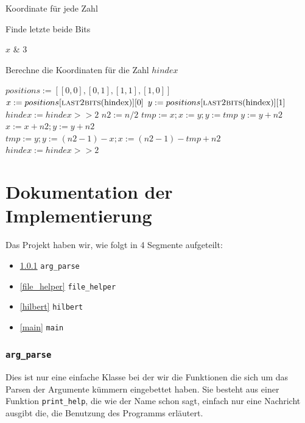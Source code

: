 \documentclass[course=erap]{aspdoc}
\begin{document}
\begin{algorithm}[H]
\caption{Koordinate für jede Zahl}
\begin{algorithmic}[1]
    \State {}
\EndFor
\end{algorithmic}
\end{algorithm}
\begin{algorithm}[H]
\caption{Finde letzte beide Bits}
\begin{algorithmic}[1]
	\State \Return $x$ \& $3$
\EndFunction
\end{algorithmic}
\end{algorithm}
\begin{algorithm}[H]
\caption{Berechne die Koordinaten für die Zahl $hindex$}
\begin{algorithmic}[1]
	\State $positions:=[ [0, 0],[0, 1],[1, 1],[1, 0] ]$
	\State $x:=positions[\Call{last2bits}{$hindex$}][0]$
	\State $y:=positions[\Call{last2bits}{$hindex$}][1]$
	\State $hindex:= hindex >> 2$
    		\State $n2:=n/2$
			\State $tmp:=x; x:=y; y:=tmp$
			\State $y:=y+n2$		
			\State $x:=x+n2; y:=y+n2$	
			\State $tmp:=y; y:=(n2-1)-x; x:=(n2-1)-tmp+n2$	
		\EndIf			
		\State $hindex:=hindex>>2$
	\EndFor
	\State \Return [x, y]
\EndFunction
\end{algorithmic}
\end{algorithm}

\section{Dokumentation der Implementierung}

Das Projekt haben wir, wie folgt in 4 Segmente aufgeteilt:
\begin{itemize}
    \item \ref{arg_parse}   \lstinline{arg_parse}
    \item \ref{file_helper} \lstinline{file_helper}
    \item \ref{hilbert}     \lstinline{hilbert}
    \item \ref{main}        \lstinline{main}
\end{itemize}

\subsubsection{\lstinline{arg_parse}}\label{arg_parse}
Dies ist nur eine einfache Klasse bei der wir die Funktionen die sich um das
Parsen der Argumente kümmern eingebettet haben. Sie besteht aus einer Funktion
\lstinline{print_help}, die wie der Name schon sagt, einfach nur eine Nachricht
ausgibt die, die Benutzung des Programms erläutert.
\end{document}
